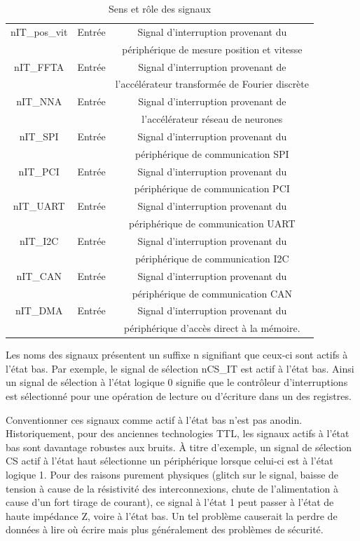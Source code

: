 \begin{table}[H]
\begin{tabular}{|c|c|c|}
		\hline
		nIT\_pos\_vit & Entrée & Signal d'interruption provenant du\\
		& & périphérique de mesure position et vitesse\\
		\hline
		nIT\_FFTA & Entrée & Signal d'interruption provenant de \\
		& & l'accélérateur transformée de Fourier discrète\\
		\hline
		nIT\_NNA & Entrée & Signal d'interruption provenant de \\
		& & l'accélérateur réseau de neurones\\
		\hline
		nIT\_SPI & Entrée & Signal d'interruption provenant du \\
		& & périphérique de communication SPI\\
		\hline
		nIT\_PCI & Entrée & Signal d'interruption provenant du \\
		& & périphérique de communication PCI\\
		\hline
		nIT\_UART & Entrée & Signal d'interruption provenant du \\
		& & périphérique de communication UART\\
		\hline
		nIT\_I2C & Entrée & Signal d'interruption provenant du \\
		& & périphérique de communication I2C\\
		\hline
		nIT\_CAN & Entrée & Signal d'interruption provenant du \\
		& & périphérique de communication CAN\\
		\hline
		nIT\_DMA & Entrée & Signal d'interruption provenant du \\
		& & périphérique d'accès direct à la mémoire.\\
		\hline
	\end{tabular}
	\caption{Sens et rôle des signaux}
	\label{tab:sens_role_signaux}
\end{table}
	
Les noms des signaux présentent un suffixe n signifiant que ceux-ci sont actifs à l'état bas.
Par exemple, le signal de sélection nCS\_IT est actif à l'état bas.
Ainsi un signal de sélection à l'état logique 0 signifie que le contrôleur d'interruptions est sélectionné pour une opération de lecture ou d'écriture dans un des registres.


Conventionner ces signaux comme actif à l'état bas n'est pas anodin.
Historiquement, pour des anciennes technologies \gls{TTL}, les signaux actifs à l'état bas sont davantage robustes aux bruits.  
À titre d'exemple, un signal de sélection CS actif à l'état haut sélectionne un périphérique lorsque celui-ci est à l'état logique 1.
Pour des raisons purement physiques (glitch sur le signal, baisse de tension à cause de la résistivité des interconnexions, chute de l'alimentation à cause d'un fort tirage de courant), ce signal à l'état 1 peut passer à l'état de haute impédance Z, voire à l'état bas.
Un tel problème causerait la perdre de données à lire où écrire mais plus généralement des problèmes de sécurité. 



